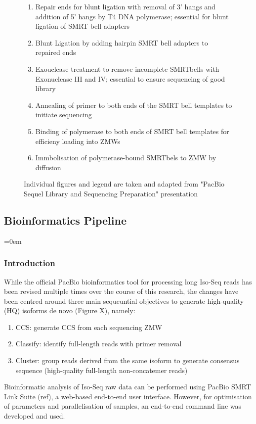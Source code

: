 \begin{figure}[!htp]
{\begin{enumerate}
			\item Repair ends for blunt ligation with removal of 3' hangs and addition of 5' hangs by T4 DNA polymerase; essential for blunt ligation of SMRT bell adapters 
			\item Blunt Ligation by adding hairpin SMRT bell adapters to repaired ends
			\item Exouclease treatment to remove incomplete SMRTbells with Exonuclease III and IV; essential to ensure sequencing of good library 
			\item Annealing of primer to both ends of the SMRT bell templates to initiate sequencing 
			\item Binding of polymerase to both ends of SMRT bell templates for efficieny loading into ZMWs
			\item Immbolisation of polymerase-bound SMRTbels to ZMW by diffusion
			\\
		\end{enumerate} 
		Individual figures and legend are taken and adapted from "PacBio Sequel Library and Sequencing Preparation" presentation
	}
	\label{fig:isoseq_labworkflow}
\end{figure}

\subsection{Bioinformatics Pipeline} 
\label{section:isoseq_bioinformatics}

\begingroup
\parindent=0em
\localtableofcontents 
\endgroup

\subsubsection{Introduction}
While the official PacBio bioinformatics tool for processing long Iso-Seq reads has been revised multiple times over the course of this research, the changes have been centred around three main sequeuntial objectives to generate high-quality (HQ) isoforms de novo (Figure X), namely: 
\begin{enumerate}
	\item CCS: generate CCS from each sequencing ZMW
	\item Classify: identify full-length reads with primer removal
	\item Cluster: group reads derived from the same isoform to generate consensus sequence (high-quality full-length non-concatemer reads)	
\end{enumerate}
Bioinformatic analysis of Iso-Seq raw data can be performed using PacBio SMRT Link Suite (ref), a web-based end-to-end user interface. However, for optimisation of parameters and parallelisation of samples, an end-to-end command line was developed and used.  

